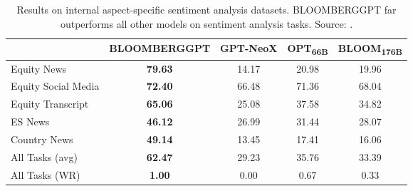 \begin{table}[h!]
	\centering
	\begin{tabularx}{\textwidth}{Xcccc}
		\toprule
		                    & \textbf{BLOOMBERGGPT} & \textbf{GPT-NeoX} & \textbf{OPT\textsubscript{66B}} & \textbf{BLOOM\textsubscript{176B}} \\
		\midrule
		Equity News         & \textbf{79.63}        & 14.17             & 20.98                           & 19.96                              \\
		Equity Social Media & \textbf{72.40}        & 66.48             & 71.36                           & 68.04                              \\
		Equity Transcript   & \textbf{65.06}        & 25.08             & 37.58                           & 34.82                              \\
		ES News             & \textbf{46.12}        & 26.99             & 31.44                           & 28.07                              \\
		Country News        & \textbf{49.14}        & 13.45             & 17.41                           & 16.06                              \\
		\midrule
		All Tasks (avg)     & \textbf{62.47}        & 29.23             & 35.76                           & 33.39                              \\
		All Tasks (WR)      & \textbf{1.00}         & 0.00              & 0.67                            & 0.33                               \\
		\bottomrule
	\end{tabularx}
	\caption{Results on internal aspect-specific sentiment analysis datasets. BLOOMBERGGPT far outperforms all other models on sentiment analysis tasks. Source: \protect\textcite{wu2023bloomberggpt}.}
	\label{tab:internal_aspect_sentiment}
\end{table}

